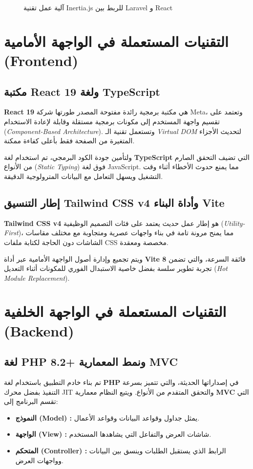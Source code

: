 \documentclass{bts-report-ar}
\begin{document}
\begin{figure}[H]
  \centering
  \begin{LTR}
  \resizebox{\textwidth}{!}{}
  \end{LTR}
  \caption{آلية عمل تقنية Inertia.js للربط بين Laravel و React}
  \label{fig:inertia-bridge}
\end{figure}

\section{التقنيات المستعملة في الواجهة الأمامية (Frontend)}
\subsection{مكتبة React 19 ولغة TypeScript}
\textbf{React 19} هي مكتبة برمجية رائدة مفتوحة المصدر طورتها شركة Meta، وتعتمد على تقسيم واجهة المستخدم إلى مكونات برمجية مستقلة وقابلة لإعادة الاستخدام (\textit{Component-Based Architecture}). وتستعمل تقنية الـ \textit{Virtual DOM} لتحديث الأجزاء المتغيرة من الصفحة فقط بأعلى كفاءة ممكنة.

ولتأمين جودة الكود البرمجي، تم استخدام لغة \textbf{TypeScript} التي تضيف التحقق الصارم من الأنواع (\textit{Static Typing}) فوق لغة JavaScript. مما يمنع حدوث الأخطاء أثناء وقت التشغيل ويسهل التعامل مع البيانات المترولوجية الدقيقة.

\subsection{إطار التنسيق Tailwind CSS v4 وأداة البناء Vite}
\textbf{Tailwind CSS v4} هو إطار عمل حديث يعتمد على فئات التصميم الوظيفية (\textit{Utility-First})، مما يمنح مرونة تامة في بناء واجهات عصرية ومتجاوبة مع مختلف مقاسات الشاشات دون الحاجة لكتابة ملفات CSS مخصصة ومعقدة. 

ويتم تجميع وإدارة أصول الواجهة الأمامية عبر أداة \textbf{Vite 8} فائقة السرعة، والتي تضمن تجربة تطوير سلسة بفضل خاصية الاستبدال الفوري للمكونات أثناء التعديل (\textit{Hot Module Replacement}).

\section{التقنيات المستعملة في الواجهة الخلفية (Backend)}
\subsection{لغة PHP 8.2+ ونمط المعمارية MVC}
تم بناء خادم التطبيق باستخدام لغة \textbf{PHP} في إصداراتها الحديثة، والتي تتميز بسرعة التنفيذ بفضل محرك JIT والتحقق المتقدم من الأنواع. ويتبع النظام معمارية \textbf{MVC} التي تقسم البرنامج إلى:
\begin{itemize}
  \item \textbf{النموذج (Model) :} يمثل جداول وقواعد البيانات وقواعد الأعمال.
  \item \textbf{الواجهة (View) :} شاشات العرض والتفاعل التي يشاهدها المستخدم.
  \item \textbf{المتحكم (Controller) :} الرابط الذي يستقبل الطلبات وينسق بين البيانات وواجهات العرض.
\end{itemize}
\end{document}
